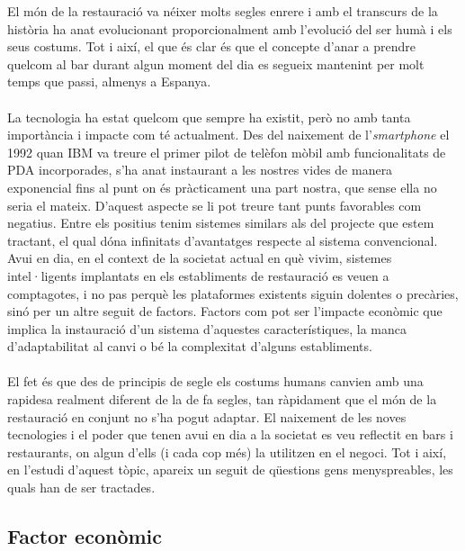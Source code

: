 El món de la restauració va néixer molts segles enrere i amb el transcurs de la història ha anat evolucionant proporcionalment amb l'evolució del ser humà i els seus costums. Tot i així, el que és clar és que el concepte d'anar a prendre quelcom al bar durant algun moment del dia es segueix mantenint per molt temps que passi, almenys a Espanya.
\\\\
La tecnologia ha estat quelcom que sempre ha existit, però no amb tanta importància i impacte com té actualment. Des del naixement de l'\textit{smartphone} \cite{smartphone} el 1992 quan IBM va treure el primer pilot de telèfon mòbil amb funcionalitats de PDA incorporades, s'ha anat instaurant a les nostres vides de manera exponencial fins al punt on és pràcticament una part nostra, que sense ella no seria el mateix. D'aquest aspecte se li pot treure tant punts favorables com negatius. Entre els positius tenim sistemes similars als del projecte que estem tractant, el qual dóna infinitats d'avantatges respecte al sistema convencional. Avui en dia, en el context de la societat actual en què vivim, sistemes intel·ligents implantats en els establiments de restauració es veuen a comptagotes, i no pas perquè les plataformes existents siguin dolentes o precàries, sinó per un altre seguit de factors. Factors com pot ser l'impacte econòmic que implica la instauració d'un sistema d'aquestes característiques, la manca d'adaptabilitat al canvi o bé la complexitat d'alguns establiments.
\\\\
El fet és que des de principis de segle els costums humans canvien amb una rapidesa realment diferent de la de fa segles, tan ràpidament que el món de la restauració en conjunt no s'ha pogut adaptar.
El naixement de les noves tecnologies i el poder que tenen avui en dia a la societat es veu reflectit en bars i restaurants, on algun d'ells (i cada cop més) la utilitzen en el negoci.
Tot i així, en l'estudi d'aquest tòpic, apareix un seguit de qüestions gens menyspreables, les quals han de ser tractades.

\subsection{Factor econòmic}

